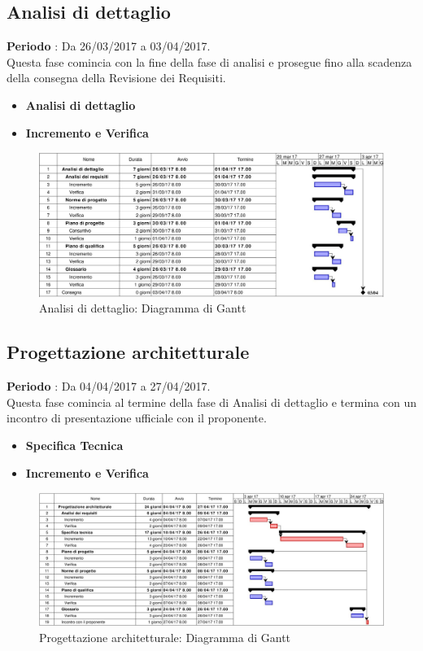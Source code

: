 \documentclass[../PianoDiProgetto.tex]{subfiles}
\begin{document}
		\subsection{Analisi di dettaglio}
		\textbf{Periodo} : Da 26/03/2017 a 03/04/2017. \\
		Questa fase comincia con la fine della fase di analisi e prosegue fino alla scadenza della consegna della Revisione dei Requisiti.
		\begin{itemize}
			\item \textbf{Analisi di dettaglio}
			\item \textbf{Incremento e Verifica}
		\end{itemize}
		\begin{figure}[H]
			\centering
			\includegraphics[scale=0.55]{Figures/Gantt_AnalisiDettaglio.jpg}
			\caption{Analisi di dettaglio: Diagramma di Gantt}
		\end{figure}
	
	
	
		\subsection{Progettazione architetturale}
		\textbf{Periodo} : Da 04/04/2017 a 27/04/2017. \\
		Questa fase comincia al termine della fase di Analisi di dettaglio e termina con un incontro di presentazione ufficiale con il proponente.
		\begin{itemize}
			\item \textbf{Specifica Tecnica}
			\item \textbf{Incremento e Verifica}
		\end{itemize}
		\begin{figure}[H]
			\centering
			\includegraphics[scale=0.55]{Figures/Gantt_ProgettazioneArchitetturale}
			\caption{Progettazione architetturale: Diagramma di Gantt}
		\end{figure}
		
\end{document}
